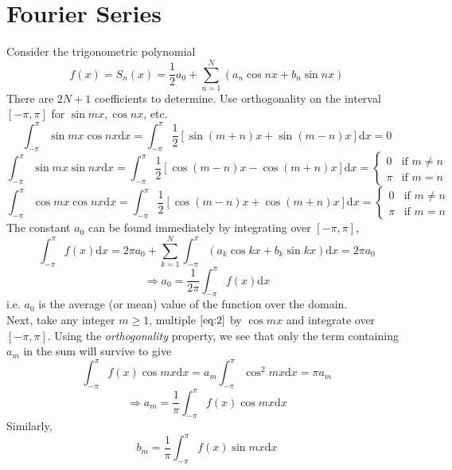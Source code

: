 \documentclass[12pt]{report}
\theoremstyle{definition}
\begin{document}
\section{Fourier Series}
Consider the trigonometric polynomial
\begin{equation}
    f(x) = S_n(x) = \frac{1}{2}a_0 + \sum_{n=1}^{N} (a_n \cos{nx} + b_n \sin{nx}) \label{eq:2}
\end{equation}
There are $2N + 1$ coefficients to determine.
Use orthogonality on the interval $[-\pi, \pi]$ for $\sin{mx}, \cos{nx}$, etc.\[
    \int_{-\pi}^{\pi} \sin{mx} \cos{nx} \mathrm{d}x 
    = \int_{-\pi}^{\pi} \frac{1}{2} [\sin{(m+n)x} + \sin{(m-n)x}]\mathrm{d}x = 0
\]\[
\int_{-\pi}^{\pi} \sin{mx} \sin{nx}\mathrm{d}x
= \int_{-\pi}^{\pi} \frac{1}{2} [\cos{(m-n)x} - \cos{(m+n)x}] \mathrm{d}x = 
\begin{cases}
    0 & \text{if } m \neq n \\
    \pi & \text{if } m = n
\end{cases}
\]\[
\int_{-\pi}^{\pi} \cos{mx} \cos{nx}\mathrm{d}x
= \int_{-\pi}^{\pi} \frac{1}{2} [\cos{(m-n)x} + \cos{(m+n)x}] \mathrm{d}x = 
\begin{cases}
    0 & \text{if } m \neq n \\
    \pi & \text{if } m = n
\end{cases}
\]
The constant $a_0$ can be found immediately by integrating over $[-\pi, \pi]$,\[
    \int_{-\pi}^{\pi} f(x)\mathrm{d}x 
    = 2\pi a_0 + \sum_{k=1}^{N} \int_{-\pi}^{\pi} (a_k \cos{kx} + b_k \sin{kx}) \mathrm{d}x = 2\pi a_0
\]\[
\Rightarrow a_0 = \frac{1}{2\pi}\int_{-\pi}^{\pi} f(x)\mathrm{d}x
\]
i.e. $a_0$ is the average (or mean) value of the function over the domain.
\smallskip
\\Next, take any integer $m \ge 1$, multiple $\eqref{eq:2}$ by $\cos{mx}$ and integrate over $[-\pi, \pi]$. 
Using the \emph{orthogonality} property, we see that only the term containing $a_m$ in the sum will survive to give\[
    \int_{-\pi}^{\pi} f(x) \cos{mx}\mathrm{d}x = a_m \int_{-\pi}^{\pi} \cos^{2}{mx}\mathrm{d}x = \pi a_m
\]\[
    \Rightarrow a_m = \frac{1}{\pi} \int_{-\pi}^{\pi} f(x)\cos{mx}\mathrm{d}x
\]
Similarly, \[
    b_m = \frac{1}{\pi} \int_{-\pi}^{\pi} f(x)\sin{mx}\mathrm{d}x
\]
\end{document}
